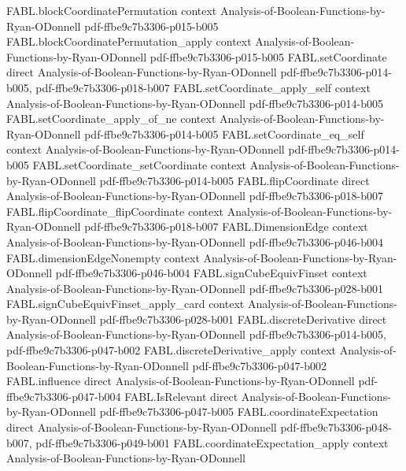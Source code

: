 \begin{theorem}
\proofstep
  {FABL.blockCoordinatePermutation}
  {context}
  {Analysis-of-Boolean-Functions-by-Ryan-ODonnell}
  {pdf-ffbe9c7b3306-p015-b005}
\proofstep
  {FABL.blockCoordinatePermutation_apply}
  {context}
  {Analysis-of-Boolean-Functions-by-Ryan-ODonnell}
  {pdf-ffbe9c7b3306-p015-b005}
\proofstep
  {FABL.setCoordinate}
  {direct}
  {Analysis-of-Boolean-Functions-by-Ryan-ODonnell}
  {pdf-ffbe9c7b3306-p014-b005,
    pdf-ffbe9c7b3306-p018-b007}
\proofstep
  {FABL.setCoordinate_apply_self}
  {context}
  {Analysis-of-Boolean-Functions-by-Ryan-ODonnell}
  {pdf-ffbe9c7b3306-p014-b005}
\proofstep
  {FABL.setCoordinate_apply_of_ne}
  {context}
  {Analysis-of-Boolean-Functions-by-Ryan-ODonnell}
  {pdf-ffbe9c7b3306-p014-b005}
\proofstep
  {FABL.setCoordinate_eq_self}
  {context}
  {Analysis-of-Boolean-Functions-by-Ryan-ODonnell}
  {pdf-ffbe9c7b3306-p014-b005}
\proofstep
  {FABL.setCoordinate_setCoordinate}
  {context}
  {Analysis-of-Boolean-Functions-by-Ryan-ODonnell}
  {pdf-ffbe9c7b3306-p014-b005}
\proofstep
  {FABL.flipCoordinate}
  {direct}
  {Analysis-of-Boolean-Functions-by-Ryan-ODonnell}
  {pdf-ffbe9c7b3306-p018-b007}
\proofstep
  {FABL.flipCoordinate_flipCoordinate}
  {context}
  {Analysis-of-Boolean-Functions-by-Ryan-ODonnell}
  {pdf-ffbe9c7b3306-p018-b007}
\proofstep
  {FABL.DimensionEdge}
  {context}
  {Analysis-of-Boolean-Functions-by-Ryan-ODonnell}
  {pdf-ffbe9c7b3306-p046-b004}
\proofstep
  {FABL.dimensionEdgeNonempty}
  {context}
  {Analysis-of-Boolean-Functions-by-Ryan-ODonnell}
  {pdf-ffbe9c7b3306-p046-b004}
\proofstep
  {FABL.signCubeEquivFinset}
  {context}
  {Analysis-of-Boolean-Functions-by-Ryan-ODonnell}
  {pdf-ffbe9c7b3306-p028-b001}
\proofstep
  {FABL.signCubeEquivFinset_apply_card}
  {context}
  {Analysis-of-Boolean-Functions-by-Ryan-ODonnell}
  {pdf-ffbe9c7b3306-p028-b001}
\proofstep
  {FABL.discreteDerivative}
  {direct}
  {Analysis-of-Boolean-Functions-by-Ryan-ODonnell}
  {pdf-ffbe9c7b3306-p014-b005,
    pdf-ffbe9c7b3306-p047-b002}
\proofstep
  {FABL.discreteDerivative_apply}
  {context}
  {Analysis-of-Boolean-Functions-by-Ryan-ODonnell}
  {pdf-ffbe9c7b3306-p047-b002}
\proofstep
  {FABL.influence}
  {direct}
  {Analysis-of-Boolean-Functions-by-Ryan-ODonnell}
  {pdf-ffbe9c7b3306-p047-b004}
\proofstep
  {FABL.IsRelevant}
  {direct}
  {Analysis-of-Boolean-Functions-by-Ryan-ODonnell}
  {pdf-ffbe9c7b3306-p047-b005}
\proofstep
  {FABL.coordinateExpectation}
  {direct}
  {Analysis-of-Boolean-Functions-by-Ryan-ODonnell}
  {pdf-ffbe9c7b3306-p048-b007,
    pdf-ffbe9c7b3306-p049-b001}
\proofstep
  {FABL.coordinateExpectation_apply}
  {context}
  {Analysis-of-Boolean-Functions-by-Ryan-ODonnell}

\end{theorem}
